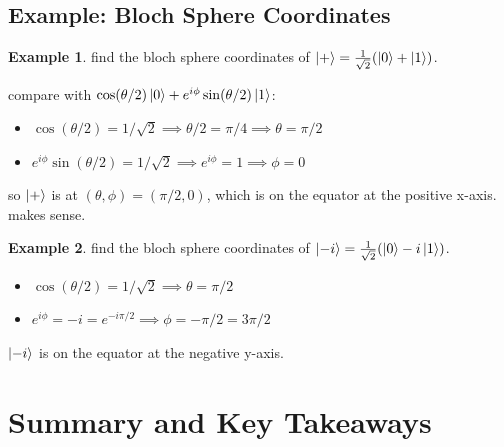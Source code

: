 \documentclass[11pt,a4paper]{article}
\theoremstyle{definition}
\newtheorem{example}{Example}[section]
\theoremstyle{remark}
\begin{document}
\subsection{Example: Bloch Sphere Coordinates}

\begin{example}
find the bloch sphere coordinates of $\ket{+} = \frac{1}{\sqrt{2}}(\ket{0} + \ket{1})$.

compare with $\cos(\theta/2)\ket{0} + e^{i\phi}\sin(\theta/2)\ket{1}$:
\begin{itemize}
    \item $\cos(\theta/2) = 1/\sqrt{2} \implies \theta/2 = \pi/4 \implies \theta = \pi/2$
    \item $e^{i\phi}\sin(\theta/2) = 1/\sqrt{2} \implies e^{i\phi} = 1 \implies \phi = 0$
\end{itemize}

so $\ket{+}$ is at $(\theta, \phi) = (\pi/2, 0)$, which is on the equator at the positive x-axis. makes sense.
\end{example}

\begin{example}
find the bloch sphere coordinates of $\ket{-i} = \frac{1}{\sqrt{2}}(\ket{0} - i\ket{1})$.

\begin{itemize}
    \item $\cos(\theta/2) = 1/\sqrt{2} \implies \theta = \pi/2$
    \item $e^{i\phi} = -i = e^{-i\pi/2} \implies \phi = -\pi/2 = 3\pi/2$
\end{itemize}

$\ket{-i}$ is on the equator at the negative y-axis.
\end{example}

\section{Summary and Key Takeaways}
\end{document}
